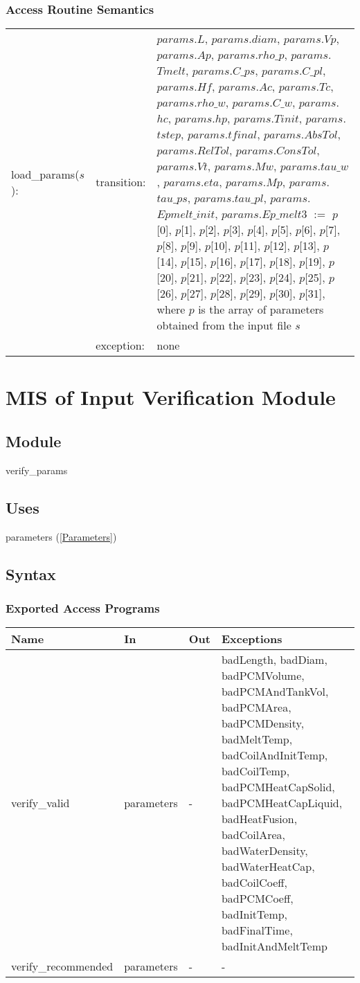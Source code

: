 \documentclass[12pt]{article}
\begin{document}
\subsubsection{Access Routine Semantics}
\begin{center}
\begin{tabular}{l l p{12cm}}
load\_params($s$): & transition: & $params$.$L$, $params$.$diam$, $params$.$Vp$, $params$.$Ap$, $params$.$rho\_p$, $params$.$Tmelt$, $params$.$C\_ps$, $params$.$C\_pl$, $params$.$Hf$, $params$.$Ac$, $params$.$Tc$, $params$.$rho\_w$, $params$.$C\_w$, $params$.$hc$, $params$.$hp$, $params$.$Tinit$, $params$.$tstep$, $params$.$tfinal$, $params$.$AbsTol$, $params$.$RelTol$, $params$.$ConsTol$, $params$.$Vt$, $params$.$Mw$, $params$.$tau\_w$, $params$.$eta$, $params$.$Mp$, $params$.$tau\_ps$, $params$.$tau\_pl$, $params$.$Epmelt\_init$, $params$.$Ep\_melt3$ $:=$ $p$[0], $p$[1], $p$[2], $p$[3], $p$[4], $p$[5], $p$[6], $p$[7], $p$[8], $p$[9], $p$[10], $p$[11], $p$[12], $p$[13], $p$[14], $p$[15], $p$[16], $p$[17], $p$[18], $p$[19], $p$[20], $p$[21], $p$[22], $p$[23], $p$[24], $p$[25], $p$[26], $p$[27], $p$[28], $p$[29], $p$[30], $p$[31], where $p$ is the array of parameters obtained from the input file $s$ \\
& exception: & none \\
\end{tabular}
\end{center}

\section{MIS of Input Verification Module} \label{VerifyInput}
\subsection{Module}
verify\_params
\subsection{Uses}
parameters (\ref{Parameters})
\subsection{Syntax}
\subsubsection{Exported Access Programs}
\begin{center}
\begin{tabular}{p{4cm} p{2cm} p{2cm} p{6cm}}
\hline
\textbf{Name} & \textbf{In} & \textbf{Out} & \textbf{Exceptions} \\
\hline
verify\_valid & parameters & - & badLength, badDiam, badPCMVolume, badPCMAndTankVol, badPCMArea, badPCMDensity, badMeltTemp, badCoilAndInitTemp, badCoilTemp, badPCMHeatCapSolid, badPCMHeatCapLiquid, badHeatFusion, badCoilArea, badWaterDensity, badWaterHeatCap, badCoilCoeff, badPCMCoeff, badInitTemp, badFinalTime, badInitAndMeltTemp \\
\hline
verify\_recommended & parameters & - & - \\
\hline
\end{tabular}
\end{center}
\end{document}

